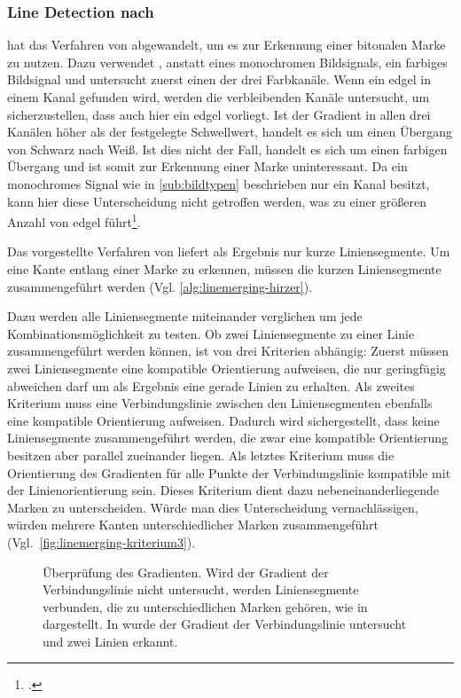 \subsubsection{Line Detection nach \citeauthor{hirzer08}} %
\label{sub:line_detection_hirzer}

\citeauthor{hirzer08} hat das Verfahren von \citeauthor{clarke96} abgewandelt, um es zur Erkennung einer bitonalen
 Marke zu nutzen. Dazu verwendet \citeauthor{hirzer08}, anstatt eines monochromen Bildsignals, ein farbiges Bildsignal
 und untersucht zuerst einen der drei Farbkanäle. Wenn ein \gls{edgel} in einem Kanal gefunden wird, werden die
 verbleibenden Kanäle untersucht, um sicherzustellen, dass auch hier ein \gls{edgel} vorliegt. Ist der Gradient in
 allen drei Kanälen höher als der festgelegte Schwellwert, handelt es sich um einen Übergang  von Schwarz nach Weiß.
 Ist dies nicht der Fall, handelt es sich um einen farbigen Übergang und ist somit zur Erkennung einer Marke
 uninteressant. Da ein monochromes Signal wie in \autoref{sub:bildtypen} beschrieben nur ein Kanal besitzt, kann hier
 diese Unterscheidung nicht getroffen werden, was zu einer größeren Anzahl von \gls{edgel}
 führt\footcite[Vgl.][S.~6--7]{hirzer08}.

Das vorgestellte Verfahren von \citeauthor{clarke96} liefert als Ergebnis nur kurze Liniensegmente. Um eine Kante
 entlang einer Marke zu erkennen, müssen die kurzen Liniensegmente zusammengeführt werden
 (Vgl. \autoref{alg:linemerging-hirzer}).

Dazu werden alle Liniensegmente miteinander verglichen um jede Kombinationsmöglichkeit zu testen. Ob zwei
 Liniensegmente zu einer Linie zusammengeführt werden können, ist von drei Kriterien abhängig: Zuerst müssen zwei
 Liniensegmente eine kompatible Orientierung aufweisen, die nur geringfügig abweichen darf um als Ergebnis eine gerade
 Linien zu erhalten. Als zweites Kriterium muss eine Verbindungslinie zwischen den Liniensegmenten ebenfalls eine
 kompatible Orientierung aufweisen. Dadurch wird sichergestellt, dass keine Liniensegmente zusammengeführt werden, die
 zwar eine kompatible Orientierung besitzen aber parallel zueinander liegen. Als letztes Kriterium muss die
 Orientierung des Gradienten für alle Punkte der Verbindungslinie kompatible mit der Linienorientierung sein. Dieses
 Kriterium dient dazu nebeneinanderliegende Marken zu unterscheiden. Würde man dies Unterscheidung vernachlässigen,
 würden mehrere Kanten unterschiedlicher Marken zusammengeführt (Vgl.~\autoref{fig:linemerging-kriterium3}).
\begin{figure}[!ht]
	\centering
	\caption{Überprüfung des Gradienten. Wird der Gradient der Verbindungslinie nicht untersucht, werden Liniensegmente
	 verbunden, die zu unterschiedlichen Marken gehören, wie in  dargestellt. In
	  wurde der Gradient der Verbindungslinie untersucht und zwei Linien erkannt.}
	\label{fig:linemerging-kriterium3}
\end{figure}


